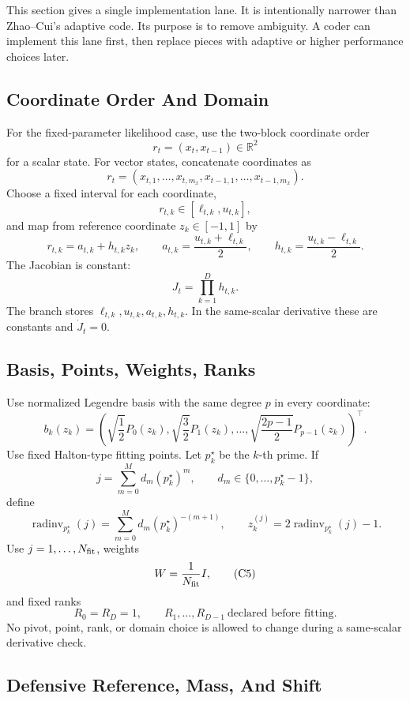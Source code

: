\documentclass[11pt]{article}
\newcommand{\R}{\mathbb R}
\begin{document}
This section gives a single implementation lane.  It is intentionally narrower
than Zhao--Cui's adaptive code.  Its purpose is to remove ambiguity.  A coder
can implement this lane first, then replace pieces with adaptive or higher
performance choices later.

\subsection{Coordinate Order And Domain}

For the fixed-parameter likelihood case, use the two-block coordinate order
\[
    r_t=(x_t,x_{t-1})\in\R^2
\]
for a scalar state.  For vector states, concatenate coordinates as
\[
    r_t=(x_{t,1},\ldots,x_{t,m_x},x_{t-1,1},\ldots,x_{t-1,m_x}).
\]
Choose a fixed interval for each coordinate,
\[
    r_{t,k}\in[\ell_{t,k},u_{t,k}],
\]
and map from reference coordinate \(z_k\in[-1,1]\) by
\[
    r_{t,k}=a_{t,k}+h_{t,k}z_k,\qquad
    a_{t,k}=\frac{u_{t,k}+\ell_{t,k}}2,\qquad
    h_{t,k}=\frac{u_{t,k}-\ell_{t,k}}2.
    \tag{C1}
\]
The Jacobian is constant:
\[
    J_t=\prod_{k=1}^{D}h_{t,k}.
    \tag{C2}
\]
The branch stores \(\ell_{t,k},u_{t,k},a_{t,k},h_{t,k}\).  In the same-scalar
derivative these are constants and \(\dot J_t=0\).

\subsection{Basis, Points, Weights, Ranks}

Use normalized Legendre basis with the same degree \(p\) in every coordinate:
\[
    b_k(z_k)=
    \left(
    \sqrt{\frac12}P_0(z_k),
    \sqrt{\frac32}P_1(z_k),
    \ldots,
    \sqrt{\frac{2p-1}{2}}P_{p-1}(z_k)
    \right)^\top.
    \tag{C3}
\]
Use fixed Halton-type fitting points.  Let \(p_k^\star\) be the \(k\)-th prime.
If
\[
    j=\sum_{m=0}^{M}d_m(p_k^\star)^m,\qquad
    d_m\in\{0,\ldots,p_k^\star-1\},
\]
define
\[
    \operatorname{radinv}_{p_k^\star}(j)
    =
    \sum_{m=0}^{M}d_m(p_k^\star)^{-(m+1)},
    \qquad
    z_k^{(j)}=2\operatorname{radinv}_{p_k^\star}(j)-1.
    \tag{C4}
\]
Use \(j=1,\ldots,N_{\rm fit}\), weights
\[
    W=\frac1{N_{\rm fit}}I,
    \tag{C5}
\]
and fixed ranks
\[
    R_0=R_D=1,\qquad R_1,\ldots,R_{D-1}\ \text{declared before fitting}.
    \tag{C6}
\]
No pivot, point, rank, or domain choice is allowed to change during a
same-scalar derivative check.

\subsection{Defensive Reference, Mass, And Shift}
\end{document}
